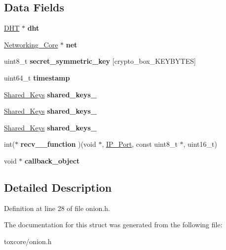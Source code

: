 \subsection*{Data Fields}
\begin{DoxyCompactItemize}
\item 
\hypertarget{struct_onion_a8b3d6ce8745acc52695e252bdb1531b6}{\hyperlink{struct_d_h_t}{D\+H\+T} $\ast$ {\bfseries dht}}\label{struct_onion_a8b3d6ce8745acc52695e252bdb1531b6}

\item 
\hypertarget{struct_onion_aa14ea2f67950f57fe4235d7375a2216c}{\hyperlink{struct_networking___core}{Networking\+\_\+\+Core} $\ast$ {\bfseries net}}\label{struct_onion_aa14ea2f67950f57fe4235d7375a2216c}

\item 
\hypertarget{struct_onion_ab9f2ff47bc0b1e5110202a6e4be86390}{uint8\+\_\+t {\bfseries secret\+\_\+symmetric\+\_\+key} \mbox{[}crypto\+\_\+box\+\_\+\+K\+E\+Y\+B\+Y\+T\+E\+S\mbox{]}}\label{struct_onion_ab9f2ff47bc0b1e5110202a6e4be86390}

\item 
\hypertarget{struct_onion_a465bef81f6478756e5443025b1f2ddfa}{uint64\+\_\+t {\bfseries timestamp}}\label{struct_onion_a465bef81f6478756e5443025b1f2ddfa}

\item 
\hypertarget{struct_onion_a7dc1514173e0fd82d265ebc3a43090ea}{\hyperlink{struct_shared___keys}{Shared\+\_\+\+Keys} {\bfseries shared\+\_\+keys\+\_}}\label{struct_onion_a7dc1514173e0fd82d265ebc3a43090ea}

\item 
\hypertarget{struct_onion_a01ec0631137b85dd55bf0cbb3492e8f5}{\hyperlink{struct_shared___keys}{Shared\+\_\+\+Keys} {\bfseries shared\+\_\+keys\+\_}}\label{struct_onion_a01ec0631137b85dd55bf0cbb3492e8f5}

\item 
\hypertarget{struct_onion_a2c2de8d3552fa4223cbf58557704b977}{\hyperlink{struct_shared___keys}{Shared\+\_\+\+Keys} {\bfseries shared\+\_\+keys\+\_}}\label{struct_onion_a2c2de8d3552fa4223cbf58557704b977}

\item 
\hypertarget{struct_onion_a980753d0df6688333680e95f637eb7a7}{int($\ast$ {\bfseries recv\+\_\+\_\+function} )(void $\ast$, \hyperlink{struct_i_p___port}{I\+P\+\_\+\+Port}, const uint8\+\_\+t $\ast$, uint16\+\_\+t)}\label{struct_onion_a980753d0df6688333680e95f637eb7a7}

\item 
\hypertarget{struct_onion_aa30dff385b8f119ddb95900b2a250a08}{void $\ast$ {\bfseries callback\+\_\+object}}\label{struct_onion_aa30dff385b8f119ddb95900b2a250a08}

\end{DoxyCompactItemize}


\subsection{Detailed Description}


Definition at line 28 of file onion.\+h.



The documentation for this struct was generated from the following file\+:\begin{DoxyCompactItemize}
\item 
toxcore/onion.\+h\end{DoxyCompactItemize}
